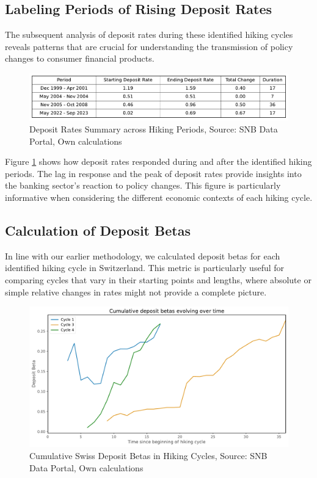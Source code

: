 \documentclass{article}
\begin{document}
\subsection{Labeling Periods of Rising Deposit Rates}

The subsequent analysis of deposit rates during these identified hiking cycles reveals patterns that are crucial for understanding the transmission of policy changes to consumer financial products.

\begin{figure}[h!]
    \centering
    \includegraphics[width=1\textwidth]{../../figures/deposit_summary_SNB.pdf}
    \caption{Deposit Rates Summary across Hiking Periods, Source: SNB Data Portal\cite{snb2023}, Own calculations}
    \label{fig:deposit_summary}
\end{figure}

Figure \ref{fig:deposit_summary} shows how deposit rates responded during and after the identified hiking periods. The lag in response and the peak of deposit rates provide insights into the banking sector's reaction to policy changes. This figure is particularly informative when considering the different economic contexts of each hiking cycle.

\subsection{Calculation of Deposit Betas}

In line with our earlier methodology, we calculated deposit betas for each identified hiking cycle in Switzerland. This metric is particularly useful for comparing cycles that vary in their starting points and lengths, where absolute or simple relative changes in rates might not provide a complete picture.

\begin{figure}[h!]
    \centering
    \includegraphics[width=1\textwidth]{../../figures/deposit_beta_SNB.pdf}
    \caption{Cumulative Swiss Deposit Betas in Hiking Cycles, Source: SNB Data Portal\cite{snb2023}, Own calculations}
    \label{fig:deposit_betas}
\end{figure}
\end{document}
